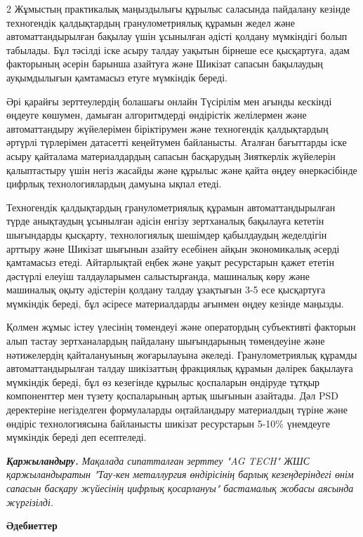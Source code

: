 \begin{multicols}{2}
Жұмыстың практикалық маңыздылығы құрылыс саласында пайдалану кезінде
техногендік қалдықтардың гранулометриялық құрамын жедел және
автоматтандырылған бақылау үшін ұсынылған әдісті қолдану мүмкіндігі
болып табылады. Бұл тәсілді іске асыру талдау уақытын бірнеше есе
қысқартуға, адам факторының әсерін барынша азайтуға және Шикізат сапасын
бақылаудың ауқымдылығын қамтамасыз етуге мүмкіндік береді.

Әрі қарайғы зерттеулердің болашағы онлайн Түсірілім мен ағынды кескінді
өңдеуге көшумен, дамыған алгоритмдерді өндірістік желілермен және
автоматтандыру жүйелерімен біріктірумен және техногендік қалдықтардың
әртүрлі түрлерімен датасетті кеңейтумен байланысты. Аталған бағыттарды
іске асыру қайталама материалдардың сапасын басқарудың Зияткерлік
жүйелерін қалыптастыру үшін негіз жасайды және құрылыс және қайта өңдеу
өнеркәсібінде цифрлық технологиялардың дамуына ықпал етеді.

Техногендік қалдықтардың гранулометриялық құрамын автоматтандырылған
түрде анықтаудың ұсынылған әдісін енгізу зертханалық бақылауға кететін
шығындарды қысқарту, технологиялық шешімдер қабылдаудың жеделдігін
арттыру және Шикізат шығынын азайту есебінен айқын экономикалық әсерді
қамтамасыз етеді. Айтарлықтай еңбек және уақыт ресурстарын қажет ететін
дәстүрлі елеуіш талдауларымен салыстырғанда, машиналық көру және
машиналық оқыту әдістерін қолдану талдау ұзақтығын 3-5 есе қысқартуға
мүмкіндік береді, бұл әсіресе материалдарды ағынмен өңдеу кезінде
маңызды.

Қолмен жұмыс істеу үлесінің төмендеуі және оператордың субъективті
факторын алып тастау зертханалардың пайдалану шығындарының төмендеуіне
және нәтижелердің қайталануының жоғарылауына әкеледі. Гранулометриялық
құрамды автоматтандырылған талдау шикізаттың фракциялық құрамын дәлірек
бақылауға мүмкіндік береді, бұл өз кезегінде құрылыс қоспаларын өндіруде
тұтқыр компоненттер мен түзету қоспаларының артық шығынын азайтады. Дәл
PSD деректеріне негізделген формулаларды оңтайландыру материалдың түріне
және өндіріс технологиясына байланысты шикізат ресурстарын 5-10\%
үнемдеуге мүмкіндік береді деп есептеледі.

\emph{{\bfseries Қаржыландыру.} Мақалада сипатталған зерттеу "AG TECH" ЖШС
қаржыландыратын "Тау-кен металлургия өндірісінің барлық кезеңдеріндегі
өнім сапасын басқару жүйесінің цифрлық қосарлануы" бастамалық жобасы
аясында жүргізілді.}
\end{multicols}

\begin{center}
{\bfseries Әдебиеттер}
\end{center}

